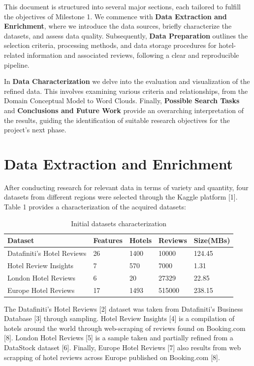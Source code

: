 \documentclass[sigconf]{acmart}
\begin{document}
This document is structured into several major sections, each tailored to fulfill the objectives of Milestone 1. We commence with \textbf{Data Extraction and Enrichment}, where we introduce the data sources, briefly characterize the datasets, and assess data quality. Subsequently, \textbf{Data Preparation} outlines the selection criteria, processing methods, and data storage procedures for hotel-related information and associated reviews, following a clear and reproducible pipeline.

In \textbf{Data Characterization} we delve into the evaluation and visualization of the refined data. This involves examining various criteria and relationships, from the Domain Conceptual Model to Word Clouds. Finally, \textbf{Possible Search Tasks} and \textbf{Conclusions and Future Work} provide an overarching interpretation of the results, guiding the identification of suitable research objectives for the project's next phase.

\section{Data Extraction and Enrichment}

After conducting research for relevant data in terms of variety and quantity, four datasets from different regions were selected through the Kaggle platform [1]. Table 1 provides a characterization of the acquired datasets:

\begin{table}[h]
\small
\caption{Initial datasets characterization}
\label{tab:freq}
\begin{tabular}{lllll}
\toprule
Dataset & Features & Hotels & Reviews & Size(MBs)\\
\midrule
Datafiniti's Hotel Reviews & 26 & 1400 & 10000 & 124.45 \\
Hotel Review Insights & 7 & 570 & 7000 & 1.31 \\
London Hotel Reviews & 6 & 20 & 27329 & 22.85 \\
Europe Hotel Reviews & 17 & 1493 & 515000 & 238.15 \\
\bottomrule
\end{tabular}
\end{table}


The Datafiniti's Hotel Reviews [2] dataset was taken from Datafiniti's Business Database [3] through sampling. Hotel Review Insights [4] is a compilation of hotels around the world through web-scraping of reviews found on Booking.com [8]. London Hotel Reviews [5] is a sample taken and partially refined from a DataStock dataset [6]. Finally, Europe Hotel Reviews [7] also results from web scrapping of hotel reviews across Europe published on Booking.com [8].
\end{document}
